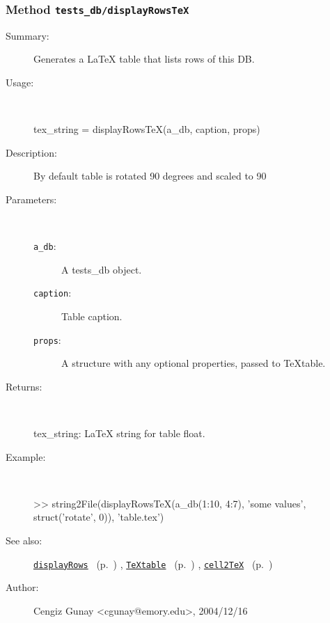 \subsubsection[Method \texttt{displayRowsTeX}]{Method \texttt{tests\_db/displayRowsTeX}}%
%
\label{ref_tests_db__displayRowsTeX}%
\hypertarget{ref_tests_db__displayRowsTeX}{}%
\begin{description}
\item[Summary:]Generates a LaTeX table that lists rows of this DB.
%
\item[Usage:]~%
\begin{lyxcode}%
tex\_string = displayRowsTeX(a\_db, caption, props)
%
\end{lyxcode}%
%
\item[Description:]%
By default table is rotated 90 degrees and scaled to 90%
\item[Parameters:]~
\begin{description}%
\item[\texttt{a\_db}:]
 A tests\_db object.
\item[\texttt{caption}:]
 Table caption.
\item[\texttt{props}:]
 A structure with any optional properties, passed to TeXtable.
\end{description}%
%
\item[Returns:]~

	tex\_string: LaTeX string for table float.
%
\item[Example:]~
\begin{lyxcode} >> string2File(displayRowsTeX(a\_db(1:10, 4:7), 'some values',\\%
                               struct('rotate', 0)), 'table.tex')\\%
\end{lyxcode}
%
\item[See also:]%
\hyperlink{ref_displayRows}{\texttt{displayRows}}%
\ (p.~\pageref{ref_displayRows})%
%
, \hyperlink{ref_TeXtable}{\texttt{TeXtable}}%
\ (p.~\pageref{ref_TeXtable})%
%
, \hyperlink{ref_cell2TeX}{\texttt{cell2TeX}}%
\ (p.~\pageref{ref_cell2TeX})%
%
%
\item[Author:]%
Cengiz Gunay <cgunay@emory.edu>, 2004/12/16%
\end{description}
\methodline%
